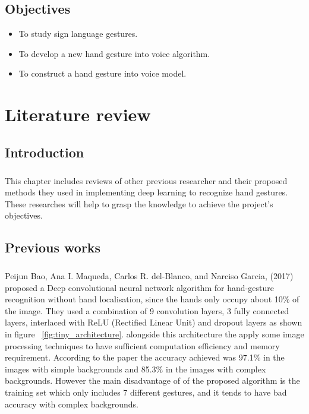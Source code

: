 \documentclass[12pt]{report}
\begin{document}
        \section{Objectives}
        \begin{itemize}
            \item To study sign language gestures.
            \item To develop a new hand gesture into voice algorithm.
            \item To construct a hand gesture into voice model.
        \end{itemize}    
    \chapter{Literature review}
        \section{Introduction}
            \paragraph{}
            This chapter includes reviews of other previous researcher
            and their proposed methods they used in implementing deep learning
            to recognize hand gestures. These researches will help to grasp the knowledge
            to achieve the project's objectives. 
        \section{Previous works}
            \paragraph{}
            Peijun Bao, Ana I. Maqueda, Carlos R. del-Blanco, and Narciso Garcia, 
            (2017) proposed a Deep convolutional neural network algorithm for hand-gesture recognition
            without hand localisation, since the hands only occupy about 10\% of the image.
            They used a combination of 9 convolution layers, 3 fully connected layers, interlaced with ReLU 
            (Rectified Linear Unit) and dropout layers as shown in figure ~\ref{fig:tiny_architecture}.
            alongside this architecture the apply some image processing techniques
            to have sufficient computation efficiency and memory requirement.
            According to the paper the accuracy achieved was 97.1\% in the images with simple backgrounds
            and 85.3\% in the images with complex backgrounds.
            However the main disadvantage of of the proposed algorithm
            is the training set which only includes 7 different gestures,
            and it tends to have bad accuracy with complex backgrounds.
             
\end{document}
